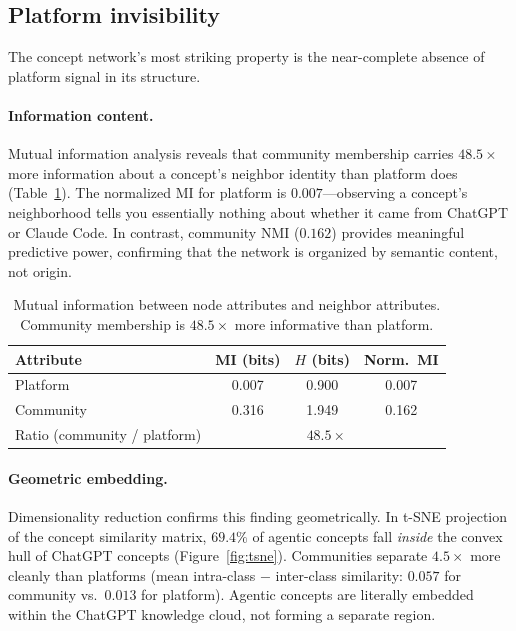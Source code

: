 \documentclass[11pt,twocolumn]{article}
\begin{document}
\subsection{Platform invisibility}
\label{sec:results:invisible}

The concept network's most striking property is the near-complete absence of platform signal in its structure.

\paragraph{Information content.}
Mutual information analysis reveals that community membership carries $48.5\times$ more information about a concept's neighbor identity than platform does (Table~\ref{tab:information}).
The normalized MI for platform is $0.007$---observing a concept's neighborhood tells you essentially nothing about whether it came from ChatGPT or Claude Code.
In contrast, community NMI ($0.162$) provides meaningful predictive power, confirming that the network is organized by semantic content, not origin.

\begin{table}[t]
  \centering
  \caption{Mutual information between node attributes and neighbor attributes.  Community membership is $48.5\times$ more informative than platform.}
  \label{tab:information}
  \begin{tabular}{lccc}
    \toprule
    Attribute & MI (bits) & $H$ (bits) & Norm.\ MI \\
    \midrule
    Platform   & 0.007 & 0.900 & 0.007 \\
    Community  & 0.316 & 1.949 & 0.162 \\
    \midrule
    Ratio (community / platform) & \multicolumn{3}{c}{$\mathbf{48.5\times}$} \\
    \bottomrule
  \end{tabular}
\end{table}

\paragraph{Geometric embedding.}
Dimensionality reduction confirms this finding geometrically.
In t-SNE projection of the concept similarity matrix, $69.4\%$ of agentic concepts fall \emph{inside} the convex hull of ChatGPT concepts (Figure~\ref{fig:tsne}).
Communities separate $4.5\times$ more cleanly than platforms (mean intra-class $-$ inter-class similarity: $0.057$ for community vs.\ $0.013$ for platform).
Agentic concepts are literally embedded within the ChatGPT knowledge cloud, not forming a separate region.
\end{document}
